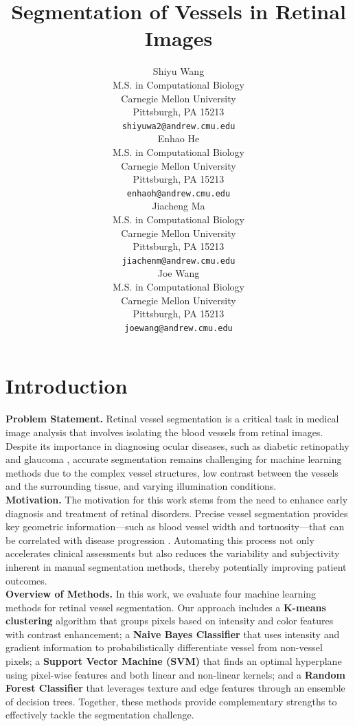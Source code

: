 \documentclass[final]{article}
\title{Segmentation of Vessels in Retinal Images}
\author{%
    Shiyu Wang \\
    M.S. in Computational Biology \\
    Carnegie Mellon University \\
    Pittsburgh, PA 15213 \\
    \texttt{shiyuwa2@andrew.cmu.edu} \\
    \And
    Enhao He \\
    M.S. in Computational Biology \\
    Carnegie Mellon University \\
    Pittsburgh, PA 15213 \\
    \texttt{enhaoh@andrew.cmu.edu} \\
    \AND
    Jiacheng Ma \\
    M.S. in Computational Biology \\
    Carnegie Mellon University \\
    Pittsburgh, PA 15213 \\
    \texttt{jiachenm@andrew.cmu.edu} \\
    \And
    Joe Wang \\
    M.S. in Computational Biology \\
    Carnegie Mellon University \\
    Pittsburgh, PA 15213 \\
    \texttt{joewang@andrew.cmu.edu} \\
}
\begin{document}
\maketitle

\vspace{-0.5cm}

\section{Introduction}
\textbf{Problem Statement.} Retinal vessel segmentation is a critical task in medical image analysis that involves isolating the blood vessels from retinal images. Despite its importance in diagnosing ocular diseases, such as diabetic retinopathy and glaucoma \citep{1}, accurate segmentation remains challenging for machine learning methods due to the complex vessel structures, low contrast between the vessels and the surrounding tissue, and varying illumination conditions. \\
\textbf{Motivation.} The motivation for this work stems from the need to enhance early diagnosis and treatment of retinal disorders. Precise vessel segmentation provides key geometric information—such as blood vessel width and tortuosity—that can be correlated with disease progression \citep{review2022}. Automating this process not only accelerates clinical assessments but also reduces the variability and subjectivity inherent in manual segmentation methods, thereby potentially improving patient outcomes. \\
\textbf{Overview of Methods.} In this work, we evaluate four machine learning methods for retinal vessel segmentation. Our approach includes a \textbf{K-means clustering} algorithm that groups pixels based on intensity and color features with contrast enhancement; a \textbf{Naive Bayes Classifier} that uses intensity and gradient information to probabilistically differentiate vessel from non-vessel pixels; a \textbf{Support Vector Machine (SVM)} that finds an optimal hyperplane using pixel-wise features and both linear and non-linear kernels; and a \textbf{Random Forest Classifier} that leverages texture and edge features through an ensemble of decision trees. Together, these methods provide complementary strengths to effectively tackle the segmentation challenge. \\
\end{document}
